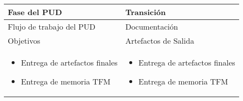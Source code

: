 \vspace{1cm}
\begin{tabular}{|p{}|p{}|}

\hline

\cellcolor[gray]{0.7}Fase del \acs{PUD} & Transición
 \\
\hline

\cellcolor[gray]{0.7}Flujo de trabajo del \acs{PUD} & Documentación

 \\
\hline


\cellcolor[gray]{0.7}Objetivos  &
\cellcolor[gray]{0.7}Artefactos de Salida \\
\hline

\begin{itemize}
\item Entrega de artefactos finales
\item Entrega de memoria \acs{TFM}
\end{itemize}

&

\begin{itemize}
\item Entrega de artefactos finales
\item Entrega de memoria \acs{TFM}
\end{itemize}
\\
\hline
\end{tabular}


